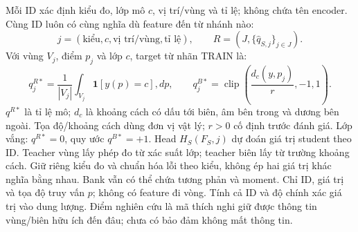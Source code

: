  Mỗi ID xác định kiểu đo, lớp mô $c$, vị trí/vùng và tỉ lệ; không chứa tên encoder. Cùng ID luôn có cùng nghĩa dù feature đến từ nhánh nào:
\[
j=(\text{kiểu},c,\text{vị trí/vùng},\text{tỉ lệ}),\qquad
R=(J,\{\hat q_{S,j}\}_{j\in J}).
\]
 Với vùng $V_j$, điểm $p_j$ và lớp $c$, target từ nhãn TRAIN là:
\[
q^{R*}_j=\frac{1}{|V_j|}\int_{V_j}\!\mathbf 1[y(p)=c],dp,
\qquad q^{B*}_j=\operatorname{clip}\!\left(\frac{d_c(y,p_j)}{r},-1,1\right).
\]
$q^{R*}$ là tỉ lệ mô; $d_c$ là khoảng cách có dấu tới biên, âm bên trong và dương bên ngoài. Tọa độ/khoảng cách dùng đơn vị vật lý; $r>0$ cố định trước đánh giá. Lớp vắng: $q^{R*}=0$, quy ước $q^{B*}=+1$.
 Head $H_S(F_S,j)$ dự đoán giá trị student theo ID. Teacher vùng lấy phép đo từ xác suất lớp; teacher biên lấy từ trường khoảng cách. Giữ riêng kiểu đo và chuẩn hóa lỗi theo kiểu, không ép hai giá trị khác nghĩa bằng nhau. Bank vẫn có thể chứa tương phản và moment.
 Chỉ ID, giá trị và tọa độ truy vấn $p$; không có feature đi vòng. Tính cả ID và độ chính xác giá trị vào dung lượng. Điểm nghiên cứu là mã thích nghi giữ được thông tin vùng/biên hữu ích đến đâu; chưa có bảo đảm không mất thông tin.
